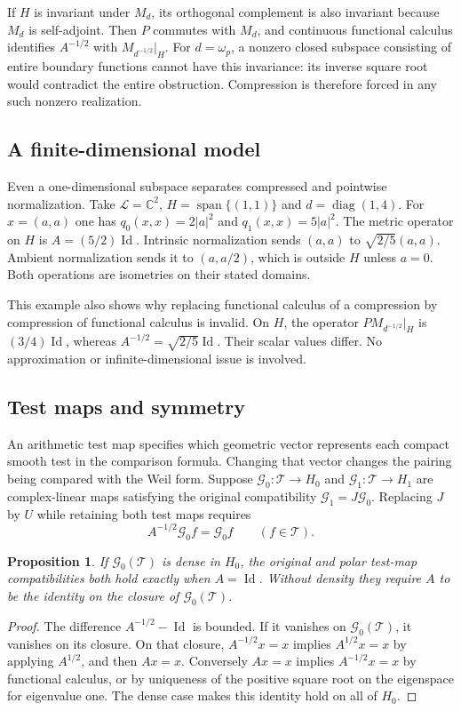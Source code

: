 \documentclass[11pt,letterpaper]{article}
\newtheorem{proposition}[theorem]{Proposition}
\theoremstyle{definition}
\theoremstyle{remark}
\newcommand{\C}{\mathbb C}
\newcommand{\T}{\mathcal T}
\newcommand{\Id}{\operatorname{Id}}
\newcommand{\Span}{\operatorname{span}}
\begin{document}
If $H$ is invariant under $M_d$, its orthogonal complement is
also invariant because $M_d$ is self-adjoint. Then $P$ commutes
with $M_d$, and continuous functional calculus identifies
$A^{-1/2}$ with $M_{d^{-1/2}}|_H$. For $d=\omega_p$, a nonzero
closed subspace consisting of entire boundary functions cannot
have this invariance: its inverse square root would contradict
the entire obstruction. Compression is therefore forced in
any such nonzero realization.

\subsection{A finite-dimensional model}

Even a one-dimensional subspace separates compressed and
pointwise normalization. Take $\mathcal L=\C^2$,
$H=\Span\{(1,1)\}$ and $d=\operatorname{diag}(1,4)$.
For $x=(a,a)$ one has $q_0(x,x)=2|a|^2$ and
$q_1(x,x)=5|a|^2$. The metric operator on $H$ is
$A=(5/2)\Id$. Intrinsic normalization sends
$(a,a)$ to $\sqrt{2/5}(a,a)$. Ambient normalization sends it
to $(a,a/2)$, which is outside $H$ unless $a=0$.
Both operations are isometries on their stated domains.

This example also shows why replacing functional calculus of
a compression by compression of functional calculus is invalid.
On $H$, the operator $PM_{d^{-1/2}}|_H$ is $(3/4)\Id$,
whereas $A^{-1/2}=\sqrt{2/5}\Id$. Their scalar values differ.
No approximation or infinite-dimensional issue is involved.

\subsection{Test maps and symmetry}

An arithmetic test map specifies which geometric vector represents
each compact smooth test in the comparison formula. Changing
that vector changes the pairing being compared with the Weil form.
Suppose $\mathcal G_0:\T\to H_0$ and
$\mathcal G_1:\T\to H_1$ are complex-linear maps satisfying the
original compatibility $\mathcal G_1=J\mathcal G_0$. Replacing $J$
by $U$ while retaining both test maps requires
\begin{equation}
 A^{-1/2}\mathcal G_0f=\mathcal G_0f\qquad(f\in\T).
 \label{eq:test-rigidity}
\end{equation}

\begin{proposition}
\label{prop:test-rigidity}
If $\mathcal G_0(\T)$ is dense in $H_0$, the original and polar
test-map compatibilities both hold exactly when $A=\Id$.
Without density they require $A$ to be the identity on the
closure of $\mathcal G_0(\T)$.
\end{proposition}
\begin{proof}
The difference $A^{-1/2}-\Id$ is bounded. If it vanishes on
$\mathcal G_0(\T)$, it vanishes on its closure. On that closure,
$A^{-1/2}x=x$ implies $A^{1/2}x=x$ by applying $A^{1/2}$,
and then $Ax=x$. Conversely $Ax=x$ implies
$A^{-1/2}x=x$ by functional calculus, or by uniqueness of
the positive square root on the eigenspace for eigenvalue one.
The dense case makes this identity hold on all of $H_0$.
\end{proof}
\end{document}
